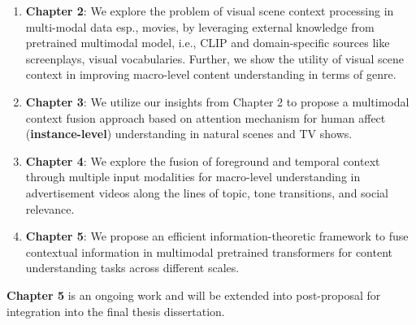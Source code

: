 \begin{enumerate}
    \item \textbf{Chapter 2}: We explore the problem of visual scene context processing in multi-modal data esp., movies, by leveraging external knowledge from pretrained multimodal model, i.e., CLIP \cite{Radford2021LearningTV} and domain-specific sources like screenplays, visual vocabularies. Further, we show the utility of visual scene context in improving macro-level content understanding in terms of genre.
    
    \item \textbf{Chapter 3}: We utilize our insights from Chapter 2 to propose a multimodal context fusion approach based on attention mechanism for human affect (\textbf{instance-level}) understanding in natural scenes and TV shows.
    
    \item \textbf{Chapter 4}: We explore the fusion of foreground and temporal context through multiple input modalities for macro-level understanding in advertisement videos along the lines of topic, tone transitions, and social relevance. 
    
    \item \textbf{Chapter 5}: We propose an efficient information-theoretic framework to fuse contextual information in multimodal pretrained transformers for content understanding tasks across different scales.
\end{enumerate}

\textbf{Chapter 5} is an ongoing work and will be extended into post-proposal for integration into the final thesis dissertation.

